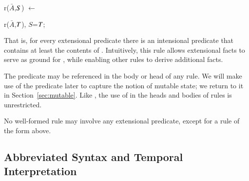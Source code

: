 \begin{dedalus}
r\pos($\bar{A}$,\(\DS\)) \(\leftarrow\)
\end{dedalus}

\hspace{5mm}
\begin{dedalus}
   r($\bar{A}$,\(\DT\)), \(S\)=\(\DT\);
\end{dedalus}

That is, for every extensional predicate  there is an intensional
predicate  that contains at least the contents of .
Intuitively, this rule allows extensional facts to serve as ground for
, while enabling other rules to derive additional  facts.

The predicate  may be referenced in the body or head of any \lang rule.  
We will make use of the predicate  later to capture the notion of mutable state; we return to it in Section~\ref{sec:mutable}. 
Like , the use of  in the heads and bodies of rules is unrestricted.

\vspace{1.2em}
No well-formed \lang rule may involve any extensional predicate, except for a rule of the form above.

\subsection{Abbreviated Syntax and Temporal Interpretation}

\label{sec:abbrvsyntax}



